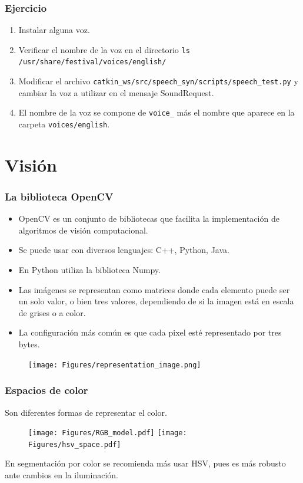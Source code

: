 \documentclass[10pt,spanish,aspectratio=1610]{beamer}
\begin{document}
\begin{frame}\frametitle{Ejercicio}
  \begin{enumerate}
  \item Instalar alguna voz.
  \item Verificar el nombre de la voz en el directorio \texttt{ls /usr/share/festival/voices/english/}
  \item Modificar el archivo \texttt{catkin\_ws/src/speech\_syn/scripts/speech\_test.py} y cambiar la voz a utilizar en el mensaje SoundRequest.
  \item El nombre de la voz se compone de \texttt{voice\_} más el nombre que aparece en la carpeta \texttt{voices/english}. 
  \end{enumerate}
\end{frame}

\section{Visión}
\begin{frame}\frametitle{La biblioteca OpenCV}
  \begin{itemize}
  \item OpenCV es un conjunto de bibliotecas que facilita la implementación de algoritmos de visión computacional.
  \item Se puede usar con diversos lenguajes: C++, Python, Java.
  \item En Python utiliza la biblioteca Numpy.
  \item Las imágenes se representan como matrices donde cada elemento puede ser un solo valor, o bien tres valores, dependiendo de si la imagen está en escala de grises o a color.
  \item La configuración más común es que cada pixel esté representado por tres bytes.
  \end{itemize}
    \begin{figure}
      \centering
      \texttt{[image: Figures/representation\_image.png]}
    \end{figure}
\end{frame}

\begin{frame}\frametitle{Espacios de color}
  Son diferentes formas de representar el color.
  \begin{figure}
    \centering
    \texttt{[image: Figures/RGB\_model.pdf]}
    \texttt{[image: Figures/hsv\_space.pdf]}
  \end{figure}
  En segmentación por color se recomienda más usar HSV, pues es más robusto ante cambios en la iluminación.
\end{frame}
\end{document}
